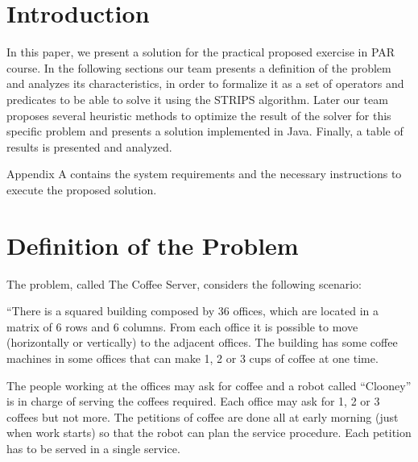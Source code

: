 \documentclass[12pt,a4paper,oneside]{article}
\numberwithin{equation}{section}
\numberwithin{equation}{section}
\theoremstyle{definition}
\begin{document}
\newpage


\renewcommand*{\contentsname}{Index of contents}
\tableofcontents

\newpage

\pagestyle{fancy}
\setcounter{page}{1}

\section{Introduction} \label{Introduction}

In this paper, we present a solution for the practical proposed exercise\cite{problemdefinition} in PAR course\cite{par}. In the following sections our team presents a definition of the problem and analyzes its characteristics, in order to formalize it as a set of operators and predicates to be able to solve it using the STRIPS algorithm\cite{strips}. Later our team proposes several heuristic methods to optimize the result of the solver for this specific problem and presents a solution implemented in Java\cite{java}. Finally, a table of results is presented and analyzed.


Appendix A contains the system requirements and the necessary instructions to execute the proposed solution.


\section{Definition of the Problem} \label{Definition of the Problem}

The problem, called The Coffee Server\cite{problemdefinition}, considers the following scenario:


“There is a squared building composed by 36 offices, which are located in a matrix of 6 rows and 6 columns. From each office it is possible to move (horizontally or vertically) to the adjacent offices. The building has some coffee machines in some offices that can make 1, 2 or 3 cups of coffee at one time.


The people working at the offices may ask for coffee and a robot called “Clooney” is in charge of serving the coffees required. Each office may ask for 1, 2 or 3 coffees but not more. The petitions of coffee are done all at early morning (just when work starts) so that the robot can plan the service procedure. Each petition has to be served in a single service.
\end{document}
